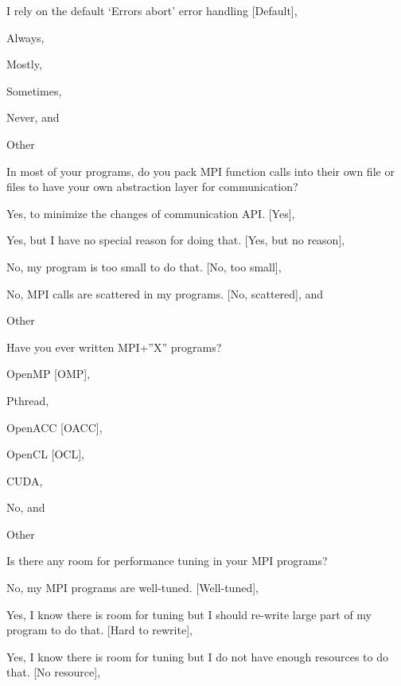 \documentclass[preprint,5p,times]{elsarticle}
\begin{document}
{{\begin{description}[leftmargin=3mm]
    \begin{inparaenum}[{\bf C}1)]
    \item I rely on the default ‘Errors abort’ error handling [Default],
    \item Always,
    \item Mostly,
    \item Sometimes,
    \item Never, and
    \item Other
    \end{inparaenum}
  \item[Q21:] In most of your programs, do you pack MPI function calls into their own file or files to have your own abstraction layer for communication?
    \begin{inparaenum}[{\bf C}1)]
    \item Yes, to minimize the changes of communication API. [Yes],
    \item Yes, but I have no special reason for doing that. [Yes, but no reason],
    \item No, my program is too small to do that. [No, too small],
    \item No, MPI calls are scattered in my programs. [No, scattered], and
    \item Other
    \end{inparaenum}
  \item[Q22*:] Have you ever written MPI+”X” programs?
    \begin{inparaenum}[{\bf C}1)]
    \item OpenMP [OMP],
    \item Pthread,
    \item OpenACC [OACC],
    \item OpenCL [OCL],
    \item CUDA,
    \item No, and
    \item Other
    \end{inparaenum}
  \item[Q23:] Is there any room for performance tuning in your MPI programs?
    \begin{inparaenum}[{\bf C}1)]
    \item No, my MPI programs are well-tuned. [Well-tuned],
    \item Yes, I know there is room for tuning but I should re-write large
      part of my program to do that. [Hard to rewrite],
    \item Yes, I know there is room for tuning but I do not have enough resources to do that. [No resource],

\end{inparaenum}
\end{description}}}
\end{document}
